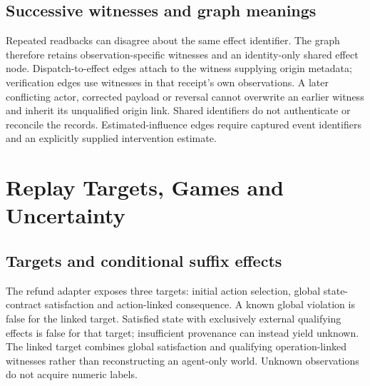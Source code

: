\documentclass[conference]{IEEEtran}
\begin{document}
\subsection{Successive witnesses and graph meanings}
Repeated readbacks can disagree about the same effect identifier. The graph
therefore retains observation-specific witnesses and an identity-only shared
effect node. Dispatch-to-effect edges attach to the witness supplying origin
metadata; verification edges use witnesses in that receipt's own observations.
A later conflicting actor, corrected payload or reversal cannot overwrite an
earlier witness and inherit its unqualified origin link. Shared identifiers do
not authenticate or reconcile the records. Estimated-influence edges require
captured event identifiers and an explicitly supplied intervention estimate.

\section{Replay Targets, Games and Uncertainty}
\subsection{Targets and conditional suffix effects}
The refund adapter exposes three targets: initial action selection, global
state-contract satisfaction and action-linked consequence. A known global
violation is false for the linked target. Satisfied state with exclusively
external qualifying effects is false for that target; insufficient provenance
can instead yield unknown. The linked target combines global satisfaction and
qualifying operation-linked witnesses rather than reconstructing an agent-only
world. Unknown observations do not acquire numeric labels.
\end{document}
